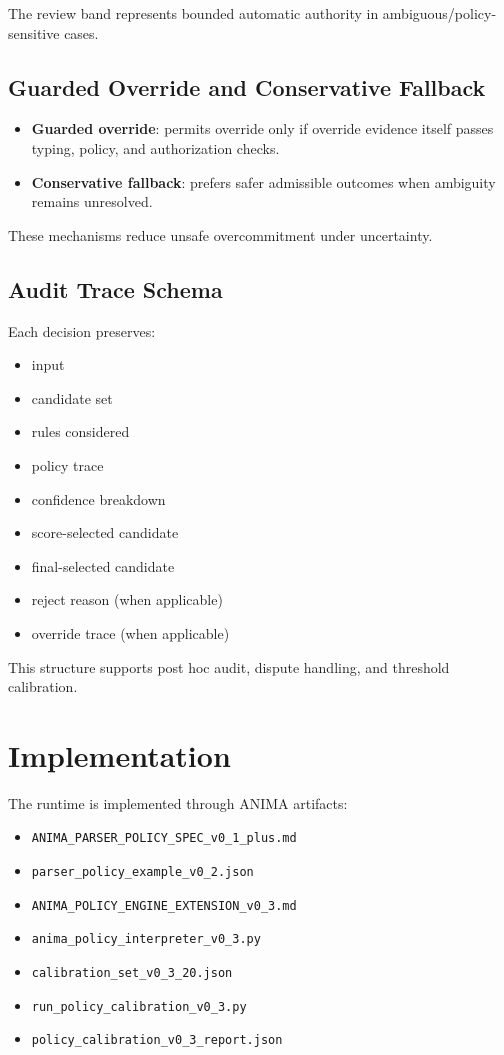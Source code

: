 \documentclass[11pt,a4paper]{article}
\begin{document}
The review band represents bounded automatic authority in ambiguous/policy-sensitive cases.

\subsection{Guarded Override and Conservative Fallback}
\begin{itemize}[leftmargin=*, itemsep=2pt]
  \item \textbf{Guarded override}: permits override only if override evidence itself passes typing, policy, and authorization checks.
  \item \textbf{Conservative fallback}: prefers safer admissible outcomes when ambiguity remains unresolved.
\end{itemize}

These mechanisms reduce unsafe overcommitment under uncertainty.

\subsection{Audit Trace Schema}
Each decision preserves:
\begin{itemize}[leftmargin=*, itemsep=2pt]
  \item input
  \item candidate set
  \item rules considered
  \item policy trace
  \item confidence breakdown
  \item score-selected candidate
  \item final-selected candidate
  \item reject reason (when applicable)
  \item override trace (when applicable)
\end{itemize}

This structure supports post hoc audit, dispute handling, and threshold calibration.

\section{Implementation}

The runtime is implemented through ANIMA artifacts:
\begin{itemize}[leftmargin=*, itemsep=2pt]
  \item \texttt{ANIMA\_PARSER\_POLICY\_SPEC\_v0\_1\_plus.md}
  \item \texttt{parser\_policy\_example\_v0\_2.json}
  \item \texttt{ANIMA\_POLICY\_ENGINE\_EXTENSION\_v0\_3.md}
  \item \texttt{anima\_policy\_interpreter\_v0\_3.py}
  \item \texttt{calibration\_set\_v0\_3\_20.json}
  \item \texttt{run\_policy\_calibration\_v0\_3.py}
  \item \texttt{policy\_calibration\_v0\_3\_report.json}
\end{itemize}
\end{document}
